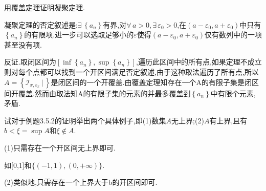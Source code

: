      \begin{exercise}
         用覆盖定理证明凝聚定理.
     \end{exercise}
     \begin{solution}
         凝聚定理的否定叙述是:$\exists\, \left\{a_n\right\}$有界,对$\forall\, a>0,\exists\, \varepsilon_0>0$,在$\left(a-\varepsilon_0,a+\varepsilon_0\right)$中只有$\left\{a_n\right\}$的有限项.进一步可以选取足够小的$\varepsilon$使得$\left(a-\varepsilon_0,a+\varepsilon_0\right)$仅有数列中的一项甚至没有项.

         反证.取闭区间为$\left[\inf\left\{a_n\right\},\sup\left\{a_n\right\}\right]$,遍历此区间中的所有点,如果定理不成立则对每个点都可以找到一个开区间满足否定叙述,由于这种取法遍历了所有点,所以$A=\left\{\mathcal{I}_{x,\varepsilon_x}\, |\, \right\}$是闭区间的一个开覆盖.由覆盖定理知存在一个A的有限子集是闭区间开覆盖.然而由取法知A的有限子集的元素的并最多覆盖到$\left\{a_n\right\}$中有限个元素,矛盾.
     \end{solution}

     \begin{exercise}
         试对于例题3.5.2的证明举出两个具体例子,即(1)数集$A$无上界;(2)$A$有上界,且有$b<\xi =\sup A$和$\xi \notin A$.
     \end{exercise}
     \begin{solution}
         (1)只需存在一个开区间无上界即可.

         如[0,1]和$\{(-1,1),(0,+\infty)\}$.

         (2)类似地,只需存在一个上界大于b的开区间即可.
     \end{solution}

